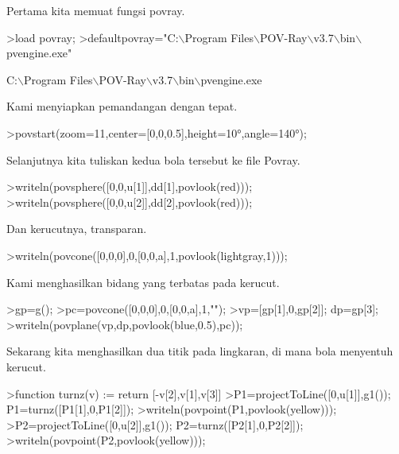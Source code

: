 \documentclass[a4paper,10pt]{article}
\begin{document}
\begin{eulernotebook}
\begin{eulercomment}
\begin{eulercomment}
\begin{eulercomment}
\begin{eulercomment}
\begin{eulercomment}
Pertama kita memuat fungsi povray.
\end{eulercomment}
\begin{eulerprompt}
>load povray;
>defaultpovray="C:\(\backslash\)Program Files\(\backslash\)POV-Ray\(\backslash\)v3.7\(\backslash\)bin\(\backslash\)pvengine.exe"
\end{eulerprompt}
\begin{euleroutput}
  C:\(\backslash\)Program Files\(\backslash\)POV-Ray\(\backslash\)v3.7\(\backslash\)bin\(\backslash\)pvengine.exe
\end{euleroutput}
\begin{eulercomment}
Kami menyiapkan pemandangan dengan tepat.
\end{eulercomment}
\begin{eulerprompt}
>povstart(zoom=11,center=[0,0,0.5],height=10°,angle=140°);
\end{eulerprompt}
\begin{eulercomment}
Selanjutnya kita tuliskan kedua bola tersebut ke file Povray.
\end{eulercomment}
\begin{eulerprompt}
>writeln(povsphere([0,0,u[1]],dd[1],povlook(red)));
>writeln(povsphere([0,0,u[2]],dd[2],povlook(red)));
\end{eulerprompt}
\begin{eulercomment}
Dan kerucutnya, transparan.
\end{eulercomment}
\begin{eulerprompt}
>writeln(povcone([0,0,0],0,[0,0,a],1,povlook(lightgray,1)));
\end{eulerprompt}
\begin{eulercomment}
Kami menghasilkan bidang yang terbatas pada kerucut.
\end{eulercomment}
\begin{eulerprompt}
>gp=g();
>pc=povcone([0,0,0],0,[0,0,a],1,"");
>vp=[gp[1],0,gp[2]]; dp=gp[3];
>writeln(povplane(vp,dp,povlook(blue,0.5),pc));
\end{eulerprompt}
\begin{eulercomment}
Sekarang kita menghasilkan dua titik pada lingkaran, di mana bola
menyentuh kerucut.
\end{eulercomment}
\begin{eulerprompt}
>function turnz(v) := return [-v[2],v[1],v[3]]
>P1=projectToLine([0,u[1]],g1()); P1=turnz([P1[1],0,P1[2]]);
>writeln(povpoint(P1,povlook(yellow)));
>P2=projectToLine([0,u[2]],g1()); P2=turnz([P2[1],0,P2[2]]);
>writeln(povpoint(P2,povlook(yellow)));
\end{eulerprompt}

\end{eulercomment}
\end{eulercomment}
\end{eulercomment}
\end{eulercomment}
\end{eulernotebook}
\end{document}
